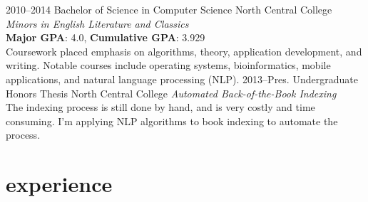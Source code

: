 \documentclass[]{friggeri-cv} %
\begin{document}
\begin{entrylist}
\entry
{2010--2014}
{Bachelor of Science {\normalfont in Computer Science}}
{North Central College}
{\textit{Minors in English Literature and Classics} \\
\textbf{Major GPA}: 4.0, \textbf{Cumulative GPA}: 3.929 \\
Coursework placed emphasis on algorithms, theory, application development, and writing.
Notable courses include operating systems, bioinformatics, mobile applications, and natural language processing (NLP).}
\entry
{2013--Pres.}
{Undergraduate {\normalfont Honors Thesis}}
{North Central College}
{\emph{Automated Back-of-the-Book Indexing} \\
The indexing process is still done by hand, and is very costly and time consuming.
I'm applying NLP algorithms to book indexing to automate the process.}

\end{entrylist}


\section{experience}
\end{document}
